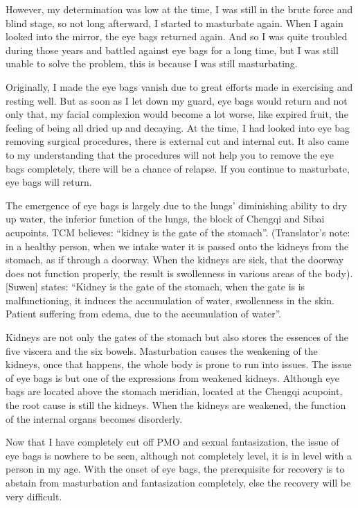 \documentclass[
]{book}
\begin{document}
However, my determination was low at the time, I was still in the brute force and blind stage, so not long afterward, I started to masturbate again. When I again looked into the mirror, the eye bags returned again. And so I was quite troubled during those years and battled against eye bags for a long time, but I was still unable to solve the problem, this is because I was still masturbating.

Originally, I made the eye bags vanish due to great efforts made in exercising and resting well. But as soon as I let down my guard, eye bags would return and not only that, my facial complexion would become a lot worse, like expired fruit, the feeling of being all dried up and decaying. At the time, I had looked into eye bag removing surgical procedures, there is external cut and internal cut. It also came to my understanding that the procedures will not help you to remove the eye bags completely, there will be a chance of relapse. If you continue to masturbate, eye bags will return.

The emergence of eye bags is largely due to the lungs' diminishing ability to dry up water, the inferior function of the lungs, the block of Chengqi and Sibai acupoints. TCM believes: ``kidney is the gate of the stomach''. (Translator's note: in a healthy person, when we intake water it is passed onto the kidneys from the stomach, as if through a doorway. When the kidneys are sick, that the doorway does not function properly, the result is swollenness in various areas of the body). {[}Suwen{]} states: ``Kidney is the gate of the stomach, when the gate is is malfunctioning, it induces the accumulation of water, swollenness in the skin. Patient suffering from edema, due to the accumulation of water''.

Kidneys are not only the gates of the stomach but also stores the essences of the five viscera and the six bowels. Masturbation causes the weakening of the kidneys, once that happens, the whole body is prone to run into issues. The issue of eye bags is but one of the expressions from weakened kidneys. Although eye bags are located above the stomach meridian, located at the Chengqi acupoint, the root cause is still the kidneys. When the kidneys are weakened, the function of the internal organs becomes disorderly.

Now that I have completely cut off PMO and sexual fantasization, the issue of eye bags is nowhere to be seen, although not completely level, it is in level with a person in my age. With the onset of eye bags, the prerequisite for recovery is to abstain from masturbation and fantasization completely, else the recovery will be very difficult.
\end{document}
